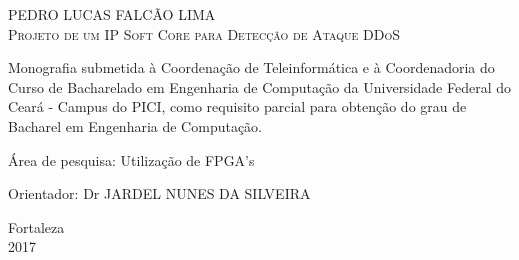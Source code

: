 \begin{titlepage}
\vfill
\begin{center}

    {\large PEDRO LUCAS FALCÃO LIMA\\}
    \vspace{2cm}
    {\Large \textsc{Projeto de um IP Soft Core para Detecção de Ataque DDoS}\\}
    \vspace{1cm}
    \hspace{.45\linewidth}
    \begin{minipage}{.50\linewidth}

            Monografia submetida à Coordenação de Teleinformática e à Coordenadoria do Curso de Bacharelado 
            em Engenharia de Computação da Universidade Federal do Ceará - Campus do PICI, como requisito 
            parcial para obtenção do grau de Bacharel em Engenharia de Computação.

            \vspace{0.5 cm}

            Área de pesquisa: Utilização de FPGA's 

            \vspace{0.5 cm}

            Orientador: Dr JARDEL NUNES DA SILVEIRA
    
    \end{minipage}

    \vspace{2cm}
    \vfill
    {\large Fortaleza\\ 2017}
\end{center}

\end{titlepage}